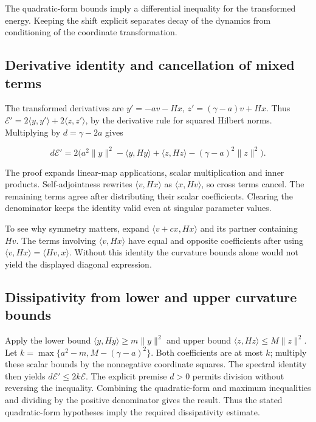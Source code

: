 \documentclass[11pt,a4paper]{report}
\begin{document}
The quadratic-form bounds imply a differential inequality for the transformed energy. Keeping the shift explicit separates decay of the dynamics from conditioning of the coordinate transformation.

\subsection{\texorpdfstring{Derivative identity and cancellation of mixed terms}{Derivative identity and cancellation of mixed terms}}
\label{report-step-KineticLangevin-Contraction-lean-1}


The transformed derivatives are \(y'=-av-Hx\), \(z'=(\gamma-a)v+Hx\). Thus \(\mathcal E'=2\langle y,y'\rangle+2\langle z,z'\rangle\), by the derivative rule for squared Hilbert norms. Multiplying by \(d=\gamma-2a\) gives

\[d\mathcal E'=2\bigl(a^2\|y\|^2-\langle y,Hy\rangle+\langle z,Hz\rangle-(\gamma-a)^2\|z\|^2\bigr).\]

The proof expands linear-map applications, scalar multiplication and inner products. Self-adjointness rewrites \(\langle v,Hx\rangle\) as \(\langle x,Hv\rangle\), so cross terms cancel. The remaining terms agree after distributing their scalar coefficients. Clearing the denominator keeps the identity valid even at singular parameter values.



To see why symmetry matters, expand \(\langle v+cx,Hx\rangle\) and its partner containing \(Hv\). The terms involving \(\langle v,Hx\rangle\) have equal and opposite coefficients after using \(\langle v,Hx\rangle=\langle Hv,x\rangle\). Without this identity the curvature bounds alone would not yield the displayed diagonal expression.

\subsection{\texorpdfstring{Dissipativity from lower and upper curvature bounds}{Dissipativity from lower and upper curvature bounds}}
\label{report-step-KineticLangevin-Contraction-lean-2}


Apply the lower bound \(\langle y,Hy\rangle\ge m\|y\|^2\) and upper bound \(\langle z,Hz\rangle\le M\|z\|^2\). Let \(k=\max\{a^2-m,M-(\gamma-a)^2\}\). Both coefficients are at most \(k\); multiply these scalar bounds by the nonnegative coordinate squares. The spectral identity then yields \(d\mathcal E'\le2k\mathcal E\). The explicit premise \(d>0\) permits division without reversing the inequality. Combining the quadratic-form and maximum inequalities and dividing by the positive denominator gives the result. Thus the stated quadratic-form hypotheses imply the required dissipativity estimate.
\end{document}
